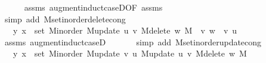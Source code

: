 \begin{isabellebody}
\ \ \ \ \isamarkupfalse%
\ assms{\isacharparenleft}{\kern0pt}{}{\isacharparenright}{\kern0pt}\ augment{\isacharunderscore}{\kern0pt}induct{\isacharunderscore}{\kern0pt}case{\isacharunderscore}{\kern0pt}{}D{\isacharparenleft}{\kern0pt}{}{}{\isacharparenright}{\kern0pt}{\isacharbrackleft}{\kern0pt}OF\ assms{\isacharbrackright}{\kern0pt}\isanewline
\ \ \ \ \isamarkupfalse%
\ {\isacharparenleft}{\kern0pt}simp\ add{\isacharcolon}{\kern0pt}\ M{\isachardot}{\kern0pt}set{\isacharunderscore}{\kern0pt}inorder{\isacharunderscore}{\kern0pt}delete{\isacharunderscore}{\kern0pt}cong{\isacharparenright}{\kern0pt}\isanewline
\ \ \isamarkupfalse%
\ \isamarkupfalse%
\ {\isachardoublequoteopen}{\isachardot}{\kern0pt}{\isachardot}{\kern0pt}{\isachardot}{\kern0pt}\ {\isasymlongleftrightarrow}\ {\isacharparenleft}{\kern0pt}y{\isacharcomma}{\kern0pt}\ x{\isacharparenright}{\kern0pt}\ {\isasymin}\ set\ {\isacharparenleft}{\kern0pt}M{\isacharunderscore}{\kern0pt}inorder\ {\isacharparenleft}{\kern0pt}M{\isacharunderscore}{\kern0pt}update\ u\ v\ {\isacharparenleft}{\kern0pt}M{\isacharunderscore}{\kern0pt}delete\ w\ M{\isacharparenright}{\kern0pt}{\isacharparenright}{\kern0pt}{\isacharparenright}{\kern0pt}\ {\isacharminus}{\kern0pt}\ {\isacharbraceleft}{\kern0pt}{\isacharparenleft}{\kern0pt}v{\isacharcomma}{\kern0pt}\ w{\isacharparenright}{\kern0pt}{\isacharbraceright}{\kern0pt}\ {\isasymunion}\ {\isacharbraceleft}{\kern0pt}{\isacharparenleft}{\kern0pt}v{\isacharcomma}{\kern0pt}\ u{\isacharparenright}{\kern0pt}{\isacharbraceright}{\kern0pt}{\isachardoublequoteclose}\isanewline
\ \ \ \ \isamarkupfalse%
\ assms\ augment{\isacharunderscore}{\kern0pt}induct{\isacharunderscore}{\kern0pt}case{\isacharunderscore}{\kern0pt}{}D{\isacharparenleft}{\kern0pt}{}{\isacharcomma}{\kern0pt}\ {}{}{\isacharparenright}{\kern0pt}\isanewline
\ \ \ \ \isamarkupfalse%
\ {\isacharparenleft}{\kern0pt}simp\ add{\isacharcolon}{\kern0pt}\ M{\isachardot}{\kern0pt}set{\isacharunderscore}{\kern0pt}inorder{\isacharunderscore}{\kern0pt}update{\isacharunderscore}{\kern0pt}cong{\isacharparenright}{\kern0pt}\isanewline
\ \ \isamarkupfalse%
\ \isamarkupfalse%
\ {\isachardoublequoteopen}{\isachardot}{\kern0pt}{\isachardot}{\kern0pt}{\isachardot}{\kern0pt}\ {\isasymlongleftrightarrow}\ {\isacharparenleft}{\kern0pt}y{\isacharcomma}{\kern0pt}\ x{\isacharparenright}{\kern0pt}\ {\isasymin}\ set\ {\isacharparenleft}{\kern0pt}M{\isacharunderscore}{\kern0pt}inorder\ {\isacharparenleft}{\kern0pt}M{\isacharunderscore}{\kern0pt}update\ v\ u\ {\isacharparenleft}{\kern0pt}M{\isacharunderscore}{\kern0pt}update\ u\ v\ {\isacharparenleft}{\kern0pt}M{\isacharunderscore}{\kern0pt}delete\ w\ M{\isacharparenright}{\kern0pt}{\isacharparenright}{\kern0pt}{\isacharparenright}{\kern0pt}{\isacharparenright}{\kern0pt}{\isachardoublequoteclose}\isanewline

\end{isabellebody}

